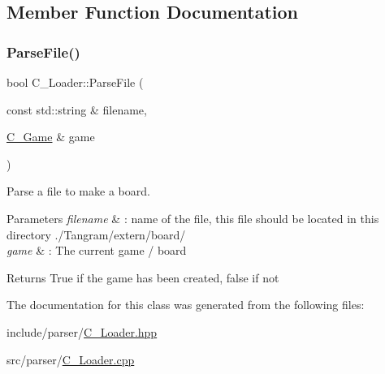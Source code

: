 \subsection{Member Function Documentation}
\mbox{\label{classC__Loader_a7a6f0089933a6108eb92390afe0ead80}} 
\subsubsection{\texorpdfstring{Parse\+File()}{ParseFile()}}
{\footnotesize\ttfamily bool C\+\_\+\+Loader\+::\+Parse\+File (\begin{DoxyParamCaption}\item[{const std\+::string \&}]{filename,  }\item[{\hyperlink{classC__Game}{C\+\_\+\+Game} \&}]{game }\end{DoxyParamCaption})\hspace{0.3cm}{\ttfamily [static]}}



Parse a file to make a board. 


\begin{DoxyParams}{Parameters}
{\em filename} & \+: name of the file, this file should be located in this directory ./\+Tangram/extern/board/ \\
\hline
{\em game} & \+: The current game / board \\
\hline
\end{DoxyParams}
\begin{DoxyReturn}{Returns}
True if the game has been created, false if not 
\end{DoxyReturn}


The documentation for this class was generated from the following files\+:\begin{DoxyCompactItemize}
\item 
include/parser/\hyperlink{C__Loader_8hpp}{C\+\_\+\+Loader.\+hpp}\item 
src/parser/\hyperlink{C__Loader_8cpp}{C\+\_\+\+Loader.\+cpp}\end{DoxyCompactItemize}
